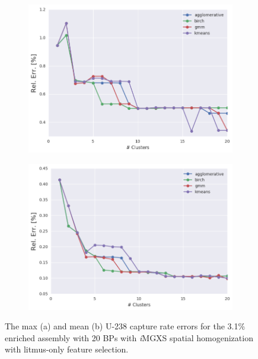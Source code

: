 \begin{figure}[h!]
\centering
\begin{subfigure}{0.9\textwidth}
  \centering
  \includegraphics[width=\linewidth]{figures/results/err-by-cluster/assm-31-20BPs/max-rel-err}
  \caption{}
  \label{fig:chap11-max-capt-err-by-cluster-assm-31-20BPs}
\end{subfigure}
\begin{subfigure}{0.9\textwidth}
  \centering
  \includegraphics[width=\linewidth]{figures/results/err-by-cluster/assm-31-20BPs/mean-rel-err}
  \caption{}
  \label{fig:chap11-mean-capt-err-by-cluster-assm-31-20BPs}
\end{subfigure}
\caption[U-238 capture rate errors for the 3.1\% enriched assembly with 20 BPs]{The max (a) and mean (b) U-238 capture rate errors for the 3.1\% enriched assembly with 20 \acp{BP} with \textit{i}\ac{MGXS} spatial homogenization with litmus-only feature selection.}
\label{fig:chap11-capt-err-by-cluster-assm-31-20BPs}
\end{figure}

